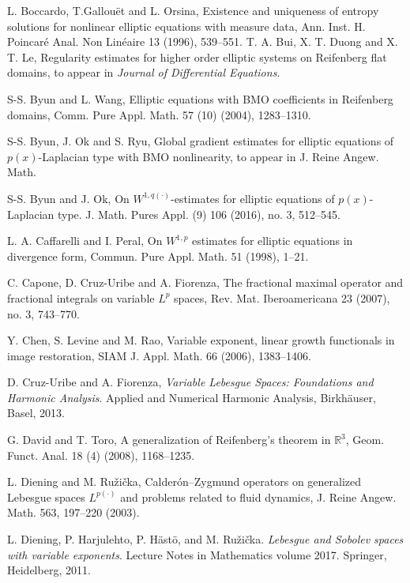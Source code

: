\documentclass[a4paper,10pt]{amsart}
\begin{document}
\begin{thebibliography}{999}
	   L. Boccardo, T.Gallou\"et and L. Orsina, Existence and uniqueness of entropy solutions for nonlinear elliptic
	  equations with measure data, Ann. Inst. H. Poincar\'e Anal. Non Lin\'eaire 13 (1996), 539--551.
	 T. A. Bui, X. T. Duong and X. T. Le, Regularity estimates for higher order elliptic systems on Reifenberg flat domains, to appear in {\it Journal of Differential Equations}. 
	  
	 S-S. Byun and L. Wang, Elliptic equations with BMO coefficients in Reifenberg domains, Comm. Pure Appl.
	Math. 57 (10) (2004), 1283--1310.
	
	 S-S. Byun, J. Ok and S. Ryu, Global gradient estimates for elliptic equations of $p(x)$-Laplacian type with BMO nonlinearity, to appear in J. Reine Angew. Math. 
	
	 S-S. Byun and J. Ok, On $W^{1,q(\cdot)}$-estimates for elliptic equations of $p(x)$-Laplacian type. J. Math. Pures Appl. (9) 106 (2016), no. 3, 512--545.
	
		
	 L. A. Caffarelli and I. Peral, On $W^{1,p}$ estimates for elliptic equations in divergence form, Commun. Pure Appl. Math. 51 (1998), 1--21.
	
	 C. Capone, D. Cruz-Uribe and A. Fiorenza, The fractional maximal operator and 	fractional integrals on variable $L^p$ spaces, Rev. Mat. Iberoamericana 23 (2007), no. 3, 743--770.
	
	 Y. Chen, S. Levine and M. Rao, Variable exponent, linear growth functionals in image restoration, SIAM J. Appl. Math. 66 (2006), 1383--1406.
	
	
	 D. Cruz-Uribe and A. Fiorenza, \emph{Variable Lebesgue Spaces: Foundations and Harmonic Analysis}.
	Applied and Numerical Harmonic Analysis, Birkh\"auser, Basel, 2013.
	
	
	 G. David and T. Toro, A generalization of Reifenberg’s theorem in $\mathbb{R}^3$, Geom. Funct. Anal. 18 (4) (2008), 1168--1235.
	
	
	 L. Diening and M.  Ru\v{z}i\v{c}ka, Calder\'on--Zygmund operators on generalized Lebesgue spaces $L^{p(\cdot)}$ and
	problems related to fluid dynamics, J. Reine Angew. Math. 563, 197–220 (2003).
	
	 L. Diening, P. Harjulehto, P. H\"ast\"o, and M. Ru\v{z}i\v{c}ka. \emph{Lebesgue and Sobolev spaces with variable
		exponents}. Lecture Notes in Mathematics volume 2017. Springer, Heidelberg, 2011.
	

\end{thebibliography}
\end{document}
